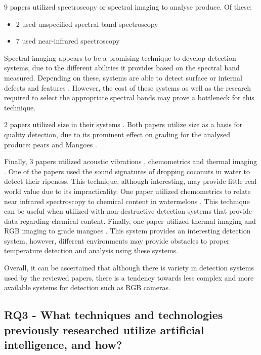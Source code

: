 \documentclass[conference]{IEEEtran}
\begin{document}
9 papers utilized spectroscopy or spectral imaging to analyse produce. Of these:

\begin{itemize}
	\item 2 used unspecified spectral band spectroscopy \cite{Geng2021} \cite{GarillosManliguez2021}
	\item 7 used near-infrared spectroscopy \cite{Zeb2022} \cite{Tran2021} \cite{Annaland2020} \cite{Lu2018} \cite{Choi2018-xp} \cite{Tamayo-Monsalve2022-ud} \cite{Rangel2021}
\end{itemize}

Spectral imaging appears to be a promising technique to develop detection systems, due to the different abilities it provides based on the spectral band measured. Depending on these, systems are able to detect surface or internal defects and features \cite{Geng2021}. However, the cost of these systems as well as the research required to select the appropriate spectral bands may prove a bottleneck for this technique.

2 papers utilized size in their systems \cite{Choi2018-xp} \cite{Wagimin2022}. Both papers utilize size as a basis for quality detection, due to its prominent effect on grading for the analysed produce: pears \cite{Choi2018-xp} and Mangoes \cite{Wagimin2022}.

Finally, 3 papers utilized acoustic vibrations \cite{Fadchar2020-pp}, chemometrics \cite{Rangel2021} and thermal imaging \cite{Bhole2020}. One of the papers used the sound signatures of dropping coconuts in water to detect their ripeness. This technique, although interesting, may provide little real world value due to its impracticality. One paper utilized chemometrics to relate near infrared spectroscopy to chemical content in watermelons \cite{Rangel2021}. This technique can be useful when utilized with non-destructive detection systems that provide data regarding chemical content. Finally, one paper utilized thermal imaging and RGB imaging to grade mangoes \cite{Bhole2020}. This system provides an interesting detection system, however, different environments may provide obstacles to proper temperature detection and analysis using these systems.

Overall, it can be ascertained that although there is variety in detection systems used by the reviewed papers, there is a tendency towards less complex and more available systems for detection such as RGB cameras.

\subsection{RQ3 - What techniques and technologies previously researched utilize artificial intelligence, and how?}
\end{document}

